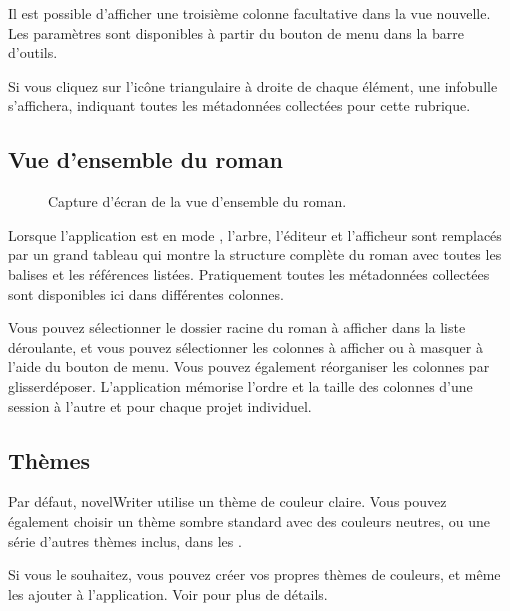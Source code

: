 \documentclass[a4paper,11pt,french]{sphinxmanual}
\begin{document}
\sphinxAtStartPar
Il est possible d’afficher une troisième colonne facultative dans la vue nouvelle. Les paramètres sont disponibles à partir du bouton de menu dans la barre d’outils.

\sphinxAtStartPar
Si vous cliquez sur l’icône triangulaire à droite de chaque élément, une infobulle s’affichera, indiquant toutes les métadonnées collectées pour cette rubrique.


\subsection{Vue d’ensemble du roman}
\label{\detokenize{usage_breakdown:novel-outline-view}}
\begin{figure}[htbp]
\centering
\capstart

\noindent{}
\caption{Capture d’écran de la vue d’ensemble du roman.}\label{\detokenize{usage_breakdown:id3}}\end{figure}

\sphinxAtStartPar
Lorsque l’application est en mode , l’arbre, l’éditeur et l’afficheur sont remplacés par un grand tableau qui montre la structure complète du roman avec toutes les balises et les références listées. Pratiquement toutes les métadonnées collectées sont disponibles ici dans différentes colonnes.

\sphinxAtStartPar
Vous pouvez sélectionner le dossier racine du roman à afficher dans la liste déroulante, et vous pouvez sélectionner les colonnes à afficher ou à masquer à l’aide du bouton de menu. Vous pouvez également réorganiser les colonnes par glisser\sphinxhyphen{}déposer. L’application mémorise l’ordre et la taille des colonnes d’une session à l’autre et pour chaque projet individuel.


\subsection{Thèmes}
\label{\detokenize{usage_breakdown:colour-themes}}
\sphinxAtStartPar
Par défaut, novelWriter utilise un thème de couleur claire. Vous pouvez également choisir un thème sombre standard avec des couleurs neutres, ou une série d’autres thèmes inclus, dans les .

\sphinxAtStartPar
Si vous le souhaitez, vous pouvez créer vos propres thèmes de couleurs, et même les ajouter à l’application. Voir {\hyperref[\detokenize{more_customise:a-custom-theme}]{}} pour plus de détails.
\end{document}
